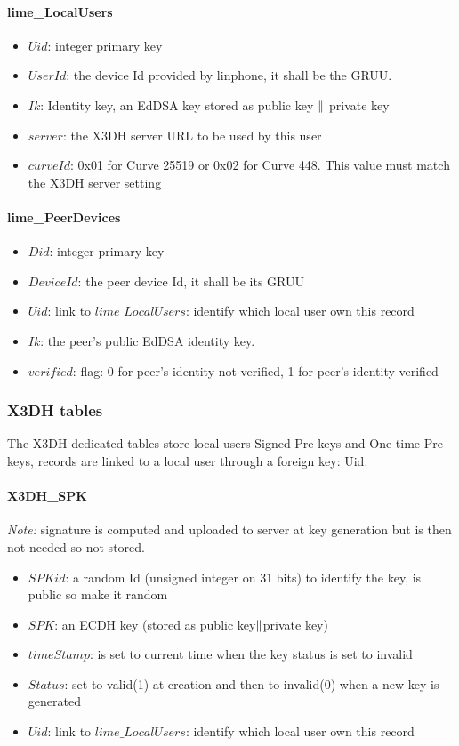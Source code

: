 \documentclass[a4paper,11pt]{article}
\begin{document}
    \paragraph*{lime\_LocalUsers}
    \begin{itemize}
      \item $Uid$: integer primary key
      \item $UserId$: the device Id provided by linphone, it shall be the GRUU.
      \item $Ik$: Identity key, an EdDSA key stored as public key $\Arrowvert $ private key
      \item $server$: the X3DH server URL to be used by this user
      \item $curveId$: 0x01 for Curve 25519 or 0x02 for Curve 448. This value must match the X3DH server setting
    \end{itemize}
    
    \paragraph*{lime\_PeerDevices}
    \begin{itemize}
      \item $Did$: integer primary key
      \item $DeviceId$: the peer device Id, it shall be its GRUU
      \item $Uid$: link to $lime\_LocalUsers$: identify which local user own this record
      \item $Ik$: the peer's public EdDSA identity key.
      \item $verified$: flag: 0 for peer's identity not verified, 1 for peer's identity verified
    \end{itemize}
    
    \subsubsection{X3DH tables}
    The X3DH dedicated tables store local users Signed Pre-keys and One-time Pre-keys, records are linked to a local user through a foreign key: Uid.
    \paragraph*{X3DH\_SPK}
    \textit{Note:} signature is computed and uploaded to server at key generation but is then not needed so not stored.
    \begin{itemize}
      \item $SPKid$: a random Id (unsigned integer on 31 bits) to identify the key, is public so make it random
      \item $SPK$: an ECDH key (stored as public key$\Arrowvert $private key)
      \item $timeStamp$: is set to current time when the key status is set to invalid
      \item $Status$: set to valid(1) at creation and then to invalid(0) when a new key is generated
      \item $Uid$: link to $lime\_LocalUsers$: identify which local user own this record
    \end{itemize}
  
\end{document}
